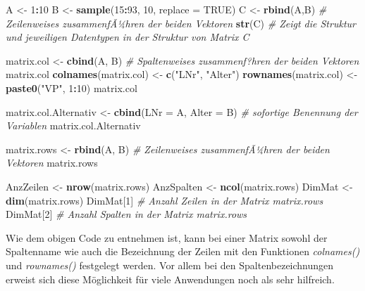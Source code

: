 \documentclass[]{article}
\newenvironment{Shaded}{\begin{snugshade}}{\end{snugshade}}
\newcommand{\KeywordTok}[1]{\textcolor[rgb]{0.13,0.29,0.53}{\textbf{#1}}}
\newcommand{\DataTypeTok}[1]{\textcolor[rgb]{0.13,0.29,0.53}{#1}}
\newcommand{\DecValTok}[1]{\textcolor[rgb]{0.00,0.00,0.81}{#1}}
\newcommand{\StringTok}[1]{\textcolor[rgb]{0.31,0.60,0.02}{#1}}
\newcommand{\CommentTok}[1]{\textcolor[rgb]{0.56,0.35,0.01}{\textit{#1}}}
\newcommand{\OtherTok}[1]{\textcolor[rgb]{0.56,0.35,0.01}{#1}}
\newcommand{\OperatorTok}[1]{\textcolor[rgb]{0.81,0.36,0.00}{\textbf{#1}}}
\newcommand{\NormalTok}[1]{#1}
\begin{document}
\begin{Shaded}
\begin{Highlighting}[]
\NormalTok{    A <-}\StringTok{ }\DecValTok{1}\OperatorTok{:}\DecValTok{10}
\NormalTok{    B <-}\StringTok{ }\KeywordTok{sample}\NormalTok{(}\DecValTok{15}\OperatorTok{:}\DecValTok{93}\NormalTok{, }\DecValTok{10}\NormalTok{, }\DataTypeTok{replace =} \OtherTok{TRUE}\NormalTok{)}
\NormalTok{    C <-}\StringTok{ }\KeywordTok{rbind}\NormalTok{(A,B)      }\CommentTok{# Zeilenweises zusammenfÃ¼hren der beiden Vektoren}
    \KeywordTok{str}\NormalTok{(C)               }\CommentTok{# Zeigt die Struktur und jeweiligen Datentypen in der Struktur von Matrix C}
    
\NormalTok{    matrix.col           <-}\StringTok{ }\KeywordTok{cbind}\NormalTok{(A, B) }\CommentTok{# Spaltenweises zusammenf?hren der beiden Vektoren}
\NormalTok{    matrix.col}
    \KeywordTok{colnames}\NormalTok{(matrix.col) <-}\StringTok{ }\KeywordTok{c}\NormalTok{(}\StringTok{"LNr"}\NormalTok{, }\StringTok{"Alter"}\NormalTok{)}
    \KeywordTok{rownames}\NormalTok{(matrix.col) <-}\StringTok{ }\KeywordTok{paste0}\NormalTok{(}\StringTok{"VP"}\NormalTok{, }\DecValTok{1}\OperatorTok{:}\DecValTok{10}\NormalTok{)}
\NormalTok{    matrix.col}

\NormalTok{    matrix.col.Alternativ <-}\StringTok{ }\KeywordTok{cbind}\NormalTok{(}\DataTypeTok{LNr =}\NormalTok{ A, }\DataTypeTok{Alter =}\NormalTok{ B) }\CommentTok{# sofortige Benennung der Variablen}
\NormalTok{    matrix.col.Alternativ}
    
\NormalTok{    matrix.rows           <-}\StringTok{ }\KeywordTok{rbind}\NormalTok{(A, B) }\CommentTok{# Zeilenweises zusammenfÃ¼hren der beiden Vektoren}
\NormalTok{    matrix.rows}
    
\NormalTok{    AnzZeilen  <-}\StringTok{ }\KeywordTok{nrow}\NormalTok{(matrix.rows)}
\NormalTok{    AnzSpalten <-}\StringTok{ }\KeywordTok{ncol}\NormalTok{(matrix.rows)}
\NormalTok{    DimMat     <-}\StringTok{ }\KeywordTok{dim}\NormalTok{(matrix.rows)}
\NormalTok{    DimMat[}\DecValTok{1}\NormalTok{] }\CommentTok{# Anzahl Zeilen in der Matrix matrix.rows}
\NormalTok{    DimMat[}\DecValTok{2}\NormalTok{] }\CommentTok{# Anzahl Spalten in der Matrix matrix.rows}
\end{Highlighting}
\end{Shaded}

Wie dem obigen Code zu entnehmen ist, kann bei einer Matrix sowohl der
Spaltenname wie auch die Bezeichnung der Zeilen mit den Funktionen
\emph{colnames()} und \emph{rownames()} festgelegt werden. Vor allem bei
den Spaltenbezeichnungen erweist sich diese Möglichkeit für viele
Anwendungen noch als sehr hilfreich.
\end{document}
